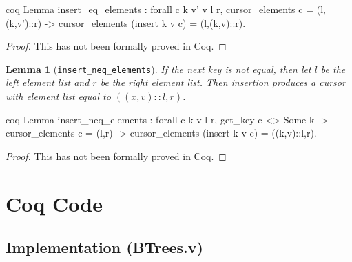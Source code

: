 \documentclass[12pt]{article}
\newtheorem{lemma}[theorem]{Lemma}
\newcommand{\nocontentsline}[3]{}
\newcommand{\tocless}[2]{\bgroup\let\addcontentsline=\nocontentsline#1{#2}\egroup}
\begin{document}
\begin{appendices}
\begin{singlespace}
\begin{cminted}{coq}
Lemma insert_eq_elements : forall c k v' v l r,
  cursor_elements c = (l,(k,v')::r) ->
  cursor_elements (insert k v c) = (l,(k,v)::r).
\end{cminted}

\begin{proof}
This has not been formally proved in Coq.
\end{proof}

\begin{lemma}[\texttt{insert\_neq\_elements}]
If the next key is not equal, then let $l$ be the left element list and $r$ be the right element list. Then insertion produces a cursor with element list equal to $((x,v)::l,r)$.
\end{lemma}

\begin{cminted}{coq}
Lemma insert_neq_elements : forall c k v l r,
  get_key c <> Some k -> cursor_elements c = (l,r) ->
  cursor_elements (insert k v c) = ((k,v)::l,r).
\end{cminted}

\begin{proof}
This has not been formally proved in Coq.
\end{proof}

\end{singlespace}

\clearpage

\section{Coq Code}
\label{app:code}

\begin{spacing}{0.8}

\tocless\subsection{Implementation (BTrees.v)}

\small\inputminted[breaklines]{coq}{./BTrees.v}

\clearpage

\tocless\subsection{Specification (BTreesModule.v)}

\small\inputminted[breaklines]{coq}{./BTreesModule.v}

\end{spacing}

\end{appendices}

\clearpage
{}

\begin{singlespace}


\end{singlespace}
\end{document}
